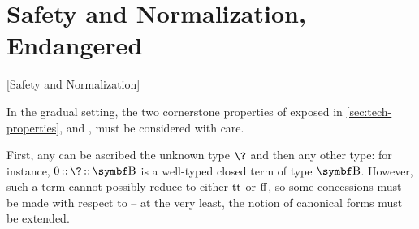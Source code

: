 \section{Safety and Normalization, Endangered}[Safety and Normalization]
\label{sec:norm-canon-endang}



In the gradual setting, the two cornerstone properties of  exposed in
\cref{sec:tech-properties}, %
and , must be considered with care.
%

First, any  can be ascribed the unknown type $\?$
and then any other type: for instance, $0 \ascop \? \ascop \Bool$ is a
well-typed closed term of type $\Bool$.%
However, such a term
cannot possibly reduce to either $\operatorname{tt}$ or $\operatorname{ff}$, so some
concessions must be made with respect to  – at the very least, the notion
of canonical forms must be extended.
%

